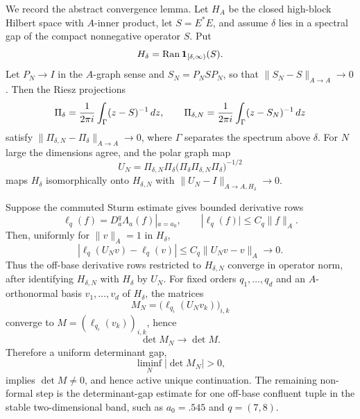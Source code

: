 \documentclass[11pt]{article}
\begin{document}
We record the abstract convergence lemma.  Let \(H_A\) be the closed high-block
Hilbert space with \(A\)-inner product, let \(S=E^\ast E\), and assume
\(\delta\) lies in a spectral gap of the compact nonnegative operator \(S\).
Put
\[
  H_\delta={\rm Ran}\,\mathbf 1_{[\delta,\infty)}(S).
\]
Let \(P_N\to I\) in the \(A\)-graph sense and \(S_N=P_NSP_N\), so that
\(\|S_N-S\|_{A\to A}\to0\).  Then the Riesz projections
\[
  \Pi_\delta={1\over 2\pi i}\int_\Gamma (z-S)^{-1}\,dz,\qquad
  \Pi_{\delta,N}={1\over 2\pi i}\int_\Gamma (z-S_N)^{-1}\,dz
\]
satisfy \(\|\Pi_{\delta,N}-\Pi_\delta\|_{A\to A}\to0\), where \(\Gamma\)
separates the spectrum above \(\delta\).  For \(N\) large the dimensions agree,
and the polar graph map
\[
  U_N=\Pi_{\delta,N}\Pi_\delta
      \bigl(\Pi_\delta\Pi_{\delta,N}\Pi_\delta\bigr)^{-1/2}
\]
maps \(H_\delta\) isomorphically onto \(H_{\delta,N}\) with
\(\|U_N-I\|_{A\to A,H_\delta}\to0\).

Suppose the commuted Sturm estimate gives bounded derivative rows
\[
  \ell_q(f)=D_a^q\Lambda_a(f)|_{a=a_0},\qquad
  |\ell_q(f)|\le C_q\|f\|_A .
\]
Then, uniformly for \(\|v\|_A=1\) in \(H_\delta\),
\[
  |\ell_q(U_Nv)-\ell_q(v)|
  \le C_q\|U_Nv-v\|_A\to0.
\]
Thus the off-base derivative rows restricted to \(H_{\delta,N}\) converge in
operator norm, after identifying \(H_{\delta,N}\) with \(H_\delta\) by \(U_N\).
For fixed orders \(q_1,\ldots,q_d\) and an \(A\)-orthonormal basis
\(v_1,\ldots,v_d\) of \(H_\delta\), the matrices
\[
  M_N=\bigl(\ell_{q_i}(U_Nv_k)\bigr)_{i,k}
\]
converge to \(M=(\ell_{q_i}(v_k))_{i,k}\), hence
\[
  \det M_N\to \det M.
\]
Therefore a uniform determinant gap,
\[
  \liminf_N |\det M_N|>0,
\]
implies \(\det M\ne0\), and hence active unique continuation.  The remaining
non-formal step is the determinant-gap estimate for one off-base confluent
tuple in the stable two-dimensional band, such as \(a_0=.545\) and
\(q=(7,8)\).
\end{document}
